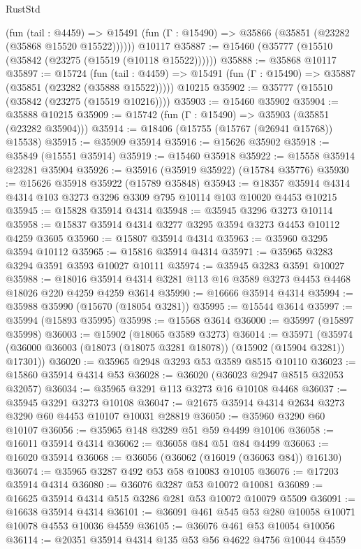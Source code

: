 \begin{lexlean}{RustStd}
\begin{coremodule}
      (fun (tail : @4459) =>
      @15491 (fun (Γ : @15490) => @35866 (@35851 (@23282 (@35868 @15520 @15522))))))
    @10117
@35887 := @15460 (@35777 (@15510 (@35842 (@23275 (@15519 (@10118 @15522))))))
@35888 := @35868 @10117
@35897 := @15724
    (fun (tail : @4459) => @15491 (fun (Γ : @15490) => @35887 (@35851 (@23282 (@35888 @15522)))))
    @10215
@35902 := @35777 (@15510 (@35842 (@23275 (@15519 @10216))))
@35903 := @15460 @35902
@35904 := @35888 @10215
@35909 := @15742 (fun (Γ : @15490) => @35903 (@35851 (@23282 @35904)))
@35914 := @18406 (@15755 (@15767 (@26941 @15768)) @15538)
@35915 := @35909 @35914
@35916 := @15626 @35902
@35918 := @35849 (@15551 @35914)
@35919 := @15460 @35918
@35922 := @15558 @35914 @23281 @35904
@35926 := @35916 (@35919 @35922) (@15784 @35776)
@35930 := @15626 @35918 @35922 (@15789 @35848)
@35943 := @18357 @35914 @4314 @4314 @103 @3273 @3296 @3309 @795 @10114 @103 @10020 @4453 @10215
@35945 := @15828 @35914 @4314
@35948 := @35945 @3296 @3273 @10114
@35958 := @15837 @35914 @4314 @3277 @3295 @3594 @3273 @4453 @10112 @4259 @3605
@35960 := @15807 @35914 @4314
@35963 := @35960 @3295 @3594 @10112
@35965 := @15816 @35914 @4314
@35971 := @35965 @3283 @3294 @3591 @3593 @10027 @10111
@35974 := @35945 @3283 @3591 @10027
@35988 := @18016 @35914 @4314 @3281 @113 @16 @3589 @3273 @4453 @4468 @18026 @220 @4259 @4259 @3614
@35990 := @16666 @35914 @4314
@35994 := @35988 @35990 (@15670 (@18054 @3281))
@35995 := @15544 @3614
@35997 := @35994 (@15893 @35995)
@35998 := @15568 @3614
@36000 := @35997 (@15897 @35998)
@36003 := @15902 (@18065 @3589 @3273)
@36014 := @35971
    (@35974 (@36000 @36003 (@18073 (@18075 @3281 @18078)) (@15902 (@15904 @3281)) @17301))
@36020 := @35965 @2948 @3293 @53 @3589 @8515 @10110
@36023 := @15860 @35914 @4314 @53
@36028 := @36020 (@36023 @2947 @8515 @32053 @32057)
@36034 := @35965 @3291 @113 @3273 @16 @10108 @4468
@36037 := @35945 @3291 @3273 @10108
@36047 := @21675 @35914 @4314 @2634 @3273 @3290 @60 @4453 @10107 @10031 @28819
@36050 := @35960 @3290 @60 @10107
@36056 := @35965 @148 @3289 @51 @59 @4499 @10106
@36058 := @16011 @35914 @4314
@36062 := @36058 @84 @51 @84 @4499
@36063 := @16020 @35914
@36068 := @36056 (@36062 (@16019 (@36063 @84)) @16130)
@36074 := @35965 @3287 @492 @53 @58 @10083 @10105
@36076 := @17203 @35914 @4314
@36080 := @36076 @3287 @53 @10072 @10081
@36089 := @16625 @35914 @4314 @515 @3286 @281 @53 @10072 @10079 @5509
@36091 := @16638 @35914 @4314
@36101 := @36091 @461 @545 @53 @280 @10058 @10071 @10078 @4553 @10036 @4559
@36105 := @36076 @461 @53 @10054 @10056
@36114 := @20351 @35914 @4314 @135 @53 @56 @4622 @4756 @10044 @4559

\end{coremodule}
\end{lexlean}
